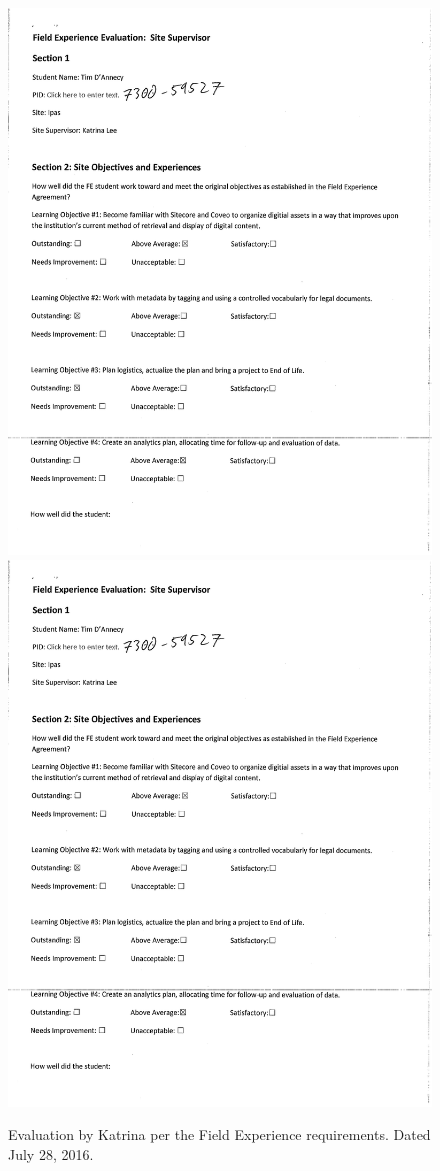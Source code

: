 \begin{figure}
   \centering
       \includegraphics[page=1,width=.45\textwidth]{documents/2016-07-28-Evaluation-Site-Supervisor} \hfill 
       \includegraphics[page=2,width=.45\textwidth]{documents/2016-07-28-Evaluation-Site-Supervisor} \hfill 
 \caption{Evaluation by Katrina per the Field Experience requirements. Dated July 28, 2016.}
 \label{fig:2016-07-28-Evaluation-Site-Supervisor}
\end{figure}
\clearpage
